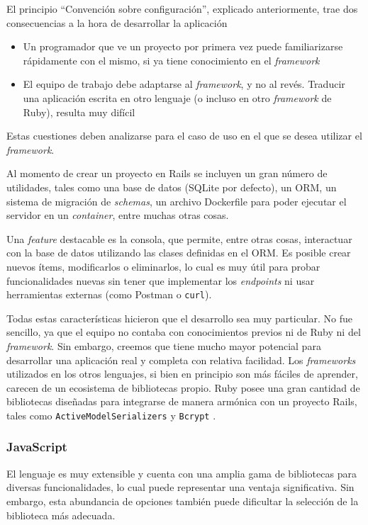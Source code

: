 \documentclass[11pt]{article}
\let\Oldsubsubsection\subsubsection
\renewcommand{\subsubsection}{\FloatBarrier\Oldsubsubsection}
\newcommand{\english}[1]{\textit{#1}}
\begin{document}
El principio ``Convención sobre configuración'', explicado anteriormente, trae dos consecuencias a la hora de desarrollar la aplicación
\begin{itemize}
    \item Un programador que ve un proyecto por primera vez puede familiarizarse rápidamente con el mismo, si ya tiene conocimiento en el \english{framework}
    \item El equipo de trabajo debe adaptarse al \english{framework}, y no al revés. Traducir una aplicación escrita en otro lenguaje (o incluso en otro \english{framework} de Ruby), resulta muy difícil
\end{itemize}
Estas cuestiones deben analizarse para el caso de uso en el que se desea utilizar el \english{framework}.

Al momento de crear un proyecto en Rails se incluyen un gran número de utilidades, tales como una base de datos (SQLite por defecto), un ORM, un sistema de migración de \english{schemas}, un archivo Dockerfile para poder ejecutar el servidor en un \english{container}, entre muchas otras cosas.

Una \english{feature} destacable es la consola, que permite, entre otras cosas, interactuar con la base de datos utilizando las clases definidas en el ORM. Es posible crear nuevos ítems, modificarlos o eliminarlos, lo cual es muy útil para probar funcionalidades nuevas sin tener que implementar los \english{endpoints} ni usar herramientas externas (como Postman o \lstinline{curl}).

Todas estas características hicieron que el desarrollo sea muy particular. No fue sencillo, ya que el equipo no contaba con conocimientos previos ni de Ruby ni del \english{framework}. Sin embargo, creemos que tiene mucho mayor potencial para desarrollar una aplicación real y completa con relativa facilidad. Los \english{frameworks} utilizados en los otros lenguajes, si bien en principio son más fáciles de aprender, carecen de un ecosistema de bibliotecas propio. Ruby posee una gran cantidad de bibliotecas diseñadas para integrarse de manera armónica con un proyecto Rails, tales como \lstinline{ActiveModelSerializers} \cite{http:ruby:active_model_serializer} y \lstinline{Bcrypt} \cite{http:ruby:bcrypt}.

\subsubsection{JavaScript}

El lenguaje es muy extensible y cuenta con una amplia gama de bibliotecas para diversas funcionalidades, lo cual puede representar una ventaja significativa. Sin embargo, esta abundancia de opciones también puede dificultar la selección de la biblioteca más adecuada.
\end{document}
